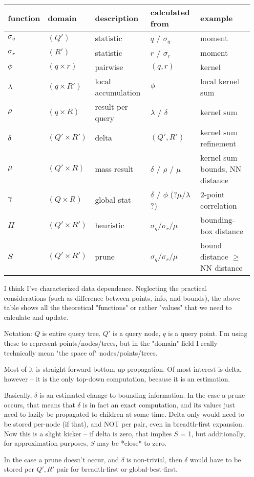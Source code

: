 \documentclass[11pt]{article}
\begin{document}
\begin{tabular}{|l|l|l|l|l|}
\hline
function   & domain           & description        & calculated from & example
\\
\hline
$\sigma_q$ & $(Q')$           & statistic          & $q$ / $\sigma_q$    & moment
\\
$\sigma_r$ & $(R')$           & statistic          & $r$ / $\sigma_r$    & moment
\\
\hline
$\phi$     & $(q \times r)$   & pairwise           & $(q, r)$            & kernel
\\
$\lambda$  & $(q \times R')$  & local accumulation & $\phi$              & local kernel sum
\\
$\rho$     & $(q \times R)$   & result per query   & $\lambda$ / $\delta$ & kernel sum
\\
\hline
$\delta$   & $(Q' \times R')$ & delta              & $(Q', R')$          & kernel sum refinement
\\
$\mu$      & $(Q' \times R)$  & mass result        & $\delta$ / $\rho$ / $\mu$ & kernel sum bounds, NN distance
\\
$\gamma$   & $(Q \times R)$   & global stat        & $\delta$ / $\phi$ (?$\mu$/$\lambda$?) & 2-point correlation
\\
\hline
$H$        & $(Q' \times R')$ & heuristic          & $\sigma_q$/$\sigma_r$/$\mu$ & bounding-box distance
\\
$S$        & $(Q' \times R')$ & prune              & $\sigma_q$/$\sigma_r$/$\mu$ & bound distance $\geq$ NN distance
\\
\hline
\end{tabular}

I think I've characterized data dependence.  Neglecting the practical
considerations (such as difference between points, info, and bounds), the above table
shows all the theoretical "functions" or rather "values" that we need to
calculate and update.

Notation: $Q$ is entire query tree, $Q'$ is a query node, $q$ is a query point.
I'm using these to represent points/nodes/trees, but in the "domain"
field I really technically mean "the space of" nodes/points/trees.

Most of it is straight-forward bottom-up propagation.
Of most interest is delta, however -- it is the only top-down computation, because it is
an estimation.

Basically, $\delta$ is an estimated change to bounding information.
In the case a prune occurs, that means that $\delta$ is in fact an exact computation, and
its values just need to lazily be propagated to children at some time.  Delta only would
need to be stored per-node (if that), and NOT per pair, even in breadth-first expansion.
Now this is a slight kicker -- if delta is zero, that implies $S$ = 1, but additionally,
for approximation purposes, $S$ may be *close* to zero.

In the case a prune doesn't occur, and $\delta$ is non-trivial, then $\delta$ would have
to be stored per $Q', R'$ pair for breadth-first or global-best-first.
\end{document}
